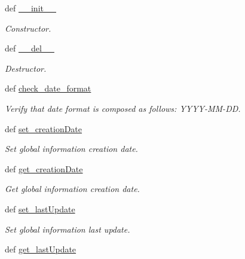 \begin{DoxyCompactItemize}
\item 
def \hyperlink{classlmf_1_1src_1_1core_1_1global__information_1_1_global_information_a8815a24e93798f1e253ba79ec38cb30f}{\+\_\+\+\_\+init\+\_\+\+\_\+}
\begin{DoxyCompactList}\small\item\em Constructor. \end{DoxyCompactList}\item 
def \hyperlink{classlmf_1_1src_1_1core_1_1global__information_1_1_global_information_a9ef2d1611e39e6d3802651da2b46ef1c}{\+\_\+\+\_\+del\+\_\+\+\_\+}
\begin{DoxyCompactList}\small\item\em Destructor. \end{DoxyCompactList}\item 
def \hyperlink{classlmf_1_1src_1_1core_1_1global__information_1_1_global_information_a77421fe11e22e249528fb247a7f2c585}{check\+\_\+date\+\_\+format}
\begin{DoxyCompactList}\small\item\em Verify that date format is composed as follows\+: Y\+Y\+Y\+Y-\/\+M\+M-\/\+D\+D. \end{DoxyCompactList}\item 
def \hyperlink{classlmf_1_1src_1_1core_1_1global__information_1_1_global_information_a34f23d2fecf02af3cdea7d9e88e9fd09}{set\+\_\+creation\+Date}
\begin{DoxyCompactList}\small\item\em Set global information creation date. \end{DoxyCompactList}\item 
def \hyperlink{classlmf_1_1src_1_1core_1_1global__information_1_1_global_information_a611e859a8104863c3396843c4a58df93}{get\+\_\+creation\+Date}
\begin{DoxyCompactList}\small\item\em Get global information creation date. \end{DoxyCompactList}\item 
def \hyperlink{classlmf_1_1src_1_1core_1_1global__information_1_1_global_information_a90d3b3a8bef7e3c4d30f5e1cbd44bdef}{set\+\_\+last\+Update}
\begin{DoxyCompactList}\small\item\em Set global information last update. \end{DoxyCompactList}\item 
def \hyperlink{classlmf_1_1src_1_1core_1_1global__information_1_1_global_information_afd398454c5b5671dc8c832f2bc04736b}{get\+\_\+last\+Update}

\end{DoxyCompactItemize}
